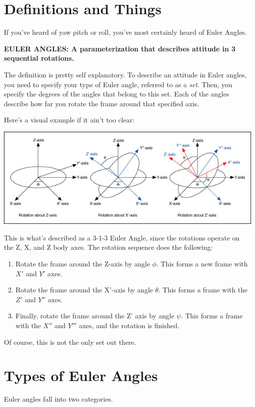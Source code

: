 \documentclass[a4paper,14pt]{extreport}
\begin{document}
\section{Definitions and Things}

If you've heard of yaw pitch or roll, you've most certainly heard of Euler Angles.
\begin{center}
\textbf{EULER ANGLES: A parameterization that describes attitude in 3 sequential rotations.}
\end{center}

The definition is pretty self explanatory. To describe an attitude in Euler angles, you need to specify your type of Euler angle, referred to as a \emph{set}. Then, you specify the degrees of the angles that belong to this set. Each of the angles describe how far you rotate the frame around that specified axis. 

Here's a visual example if it ain't too clear:

\begin{center}
\includegraphics[width=16cm]{euler_proper}
\end{center}

This is what's described as a 3-1-3 Euler Angle, since the rotations operate on the Z, X, and Z body axes. The rotation sequence does the following:
\begin{enumerate}
\item Rotate the frame around the Z-axis by angle $\phi$. This forms a new frame with $X'$ and $Y'$ axes.
\item Rotate the frame around the X'-axis by angle $\theta$. This forms a frame with the $Z'$ and $Y''$ axes.
\item Finally, rotate the frame around the Z' axis by angle $\psi$. This forms a frame with the $X''$ and $Y'''$ axes, and the rotation is finished.
\end{enumerate}

Of course, this is not the only set out there.

\section{Types of Euler Angles}
Euler angles fall into two categories.
\end{document}
